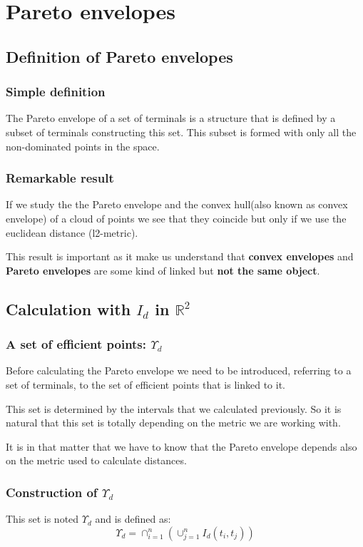 \chapter{Pareto envelopes}

\section{Definition of Pareto envelopes}%
\subsection{Simple definition}
	The Pareto envelope of a set of terminals is a structure that is defined by a subset of terminals constructing this set. This subset is formed with only all the non-dominated points in the space.
	
\subsection{Remarkable result}
	If we study the the Pareto envelope and the convex hull(also known as convex envelope) of a cloud of points we see that they coincide but only if we use the euclidean distance (l2-metric).
	
	This result is important as it make us understand that \textbf{convex envelopes} and \textbf{Pareto envelopes} are some kind of linked but \textbf{not the same object}.
	
\section{Calculation with $I_d$ in $\mathbb{R}^2$}%
\subsection{A set of efficient points: $\Upsilon_d$}%
	Before calculating the Pareto envelope we need to be introduced, referring to a set of terminals, to the set of efficient points that is linked to it.
	
	This set is determined by the intervals that we calculated previously. So it is natural that this set is totally depending on the metric we are working with.
	
	It is in that matter that we have to know that the Pareto envelope depends also on the metric used to calculate distances. 

\subsection{Construction of $\Upsilon_d$} %
\noindent This set is noted $\Upsilon_d$ and is defined as:
\begin{equation}
	\Upsilon_d = \cap^{n}_{i=1}(\cup^{n}_{j=1}I_{d}(t_i,t_j))
\end{equation}

